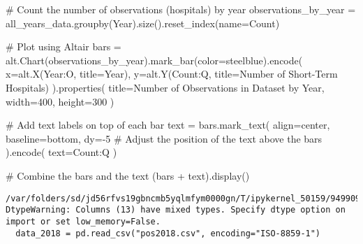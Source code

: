 \documentclass[
  letterpaper,
  DIV=11,
  numbers=noendperiod]{scrartcl}
\newenvironment{Shaded}{\begin{snugshade}}{\end{snugshade}}
\newcommand{\CommentTok}[1]{\textcolor[rgb]{0.37,0.37,0.37}{#1}}
\newcommand{\DecValTok}[1]{\textcolor[rgb]{0.68,0.00,0.00}{#1}}
\newcommand{\NormalTok}[1]{\textcolor[rgb]{0.00,0.23,0.31}{#1}}
\newcommand{\OperatorTok}[1]{\textcolor[rgb]{0.37,0.37,0.37}{#1}}
\newcommand{\StringTok}[1]{\textcolor[rgb]{0.13,0.47,0.30}{#1}}
\begin{document}
\begin{Shaded}
\begin{Highlighting}[]
\CommentTok{\# Count the number of observations (hospitals) by year}
\NormalTok{observations\_by\_year }\OperatorTok{=}\NormalTok{ all\_years\_data.groupby(}\StringTok{\textquotesingle{}Year\textquotesingle{}}\NormalTok{).size().reset\_index(name}\OperatorTok{=}\StringTok{\textquotesingle{}Count\textquotesingle{}}\NormalTok{)}

\CommentTok{\# Plot using Altair}
\NormalTok{bars }\OperatorTok{=}\NormalTok{ alt.Chart(observations\_by\_year).mark\_bar(color}\OperatorTok{=}\StringTok{\textquotesingle{}steelblue\textquotesingle{}}\NormalTok{).encode(}
\NormalTok{    x}\OperatorTok{=}\NormalTok{alt.X(}\StringTok{\textquotesingle{}Year:O\textquotesingle{}}\NormalTok{, title}\OperatorTok{=}\StringTok{\textquotesingle{}Year\textquotesingle{}}\NormalTok{),}
\NormalTok{    y}\OperatorTok{=}\NormalTok{alt.Y(}\StringTok{\textquotesingle{}Count:Q\textquotesingle{}}\NormalTok{, title}\OperatorTok{=}\StringTok{\textquotesingle{}Number of Short{-}Term Hospitals\textquotesingle{}}\NormalTok{)}
\NormalTok{).properties(}
\NormalTok{    title}\OperatorTok{=}\StringTok{\textquotesingle{}Number of Observations in Dataset by Year\textquotesingle{}}\NormalTok{,}
\NormalTok{    width}\OperatorTok{=}\DecValTok{400}\NormalTok{,}
\NormalTok{    height}\OperatorTok{=}\DecValTok{300}
\NormalTok{)}

\CommentTok{\# Add text labels on top of each bar}
\NormalTok{text }\OperatorTok{=}\NormalTok{ bars.mark\_text(}
\NormalTok{    align}\OperatorTok{=}\StringTok{\textquotesingle{}center\textquotesingle{}}\NormalTok{,}
\NormalTok{    baseline}\OperatorTok{=}\StringTok{\textquotesingle{}bottom\textquotesingle{}}\NormalTok{,}
\NormalTok{    dy}\OperatorTok{={-}}\DecValTok{5}  \CommentTok{\# Adjust the position of the text above the bars}
\NormalTok{).encode(}
\NormalTok{    text}\OperatorTok{=}\StringTok{\textquotesingle{}Count:Q\textquotesingle{}}
\NormalTok{)}

\CommentTok{\# Combine the bars and the text}
\NormalTok{(bars }\OperatorTok{+}\NormalTok{ text).display()}
\end{Highlighting}
\end{Shaded}

\begin{verbatim}
/var/folders/sd/jd56rfvs19gbncmb5yqlmfym0000gn/T/ipykernel_50159/949909169.py:7: DtypeWarning: Columns (13) have mixed types. Specify dtype option on import or set low_memory=False.
  data_2018 = pd.read_csv("pos2018.csv", encoding="ISO-8859-1")
\end{verbatim}
\end{document}
